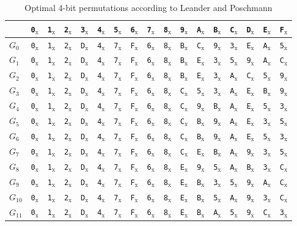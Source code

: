 \documentclass[runningheads,a4paper,english]{llncs}
\newcommand{\hex}[1]{\texttt{#1}$_\text{x}$}
\begin{document}
\begin{table}[]
    \label{tab:rep}
        \caption{Optimal 4-bit permutations according to Leander and Poschmann}
    \centering
     \begin{tabular}{l||cccccccccccccccc|}
	&{\hex{0}} &{\hex{1}} &{\hex{2}}& \hex{3}& \hex{4}& \hex{5}& \hex{6}& \hex{7}& \hex{8}& \hex{9}& \hex{A}& \hex{B}& \hex{C}& \hex{D}& \hex{E}& \hex{F}\\
	\hline\hline
 $G_0$ &\hex{0}&\hex{1}&\hex{2}&\hex{D}&\hex{4}&\hex{7}&\hex{F}&\hex{6}&\hex{8}&\hex{B}&\hex{C}&\hex{9}&\hex{3}&\hex{E}&\hex{A}&\hex{5}\\
 \hline
$G_1$ &\hex{0}&\hex{1}&\hex{2}&\hex{D}&\hex{4}&\hex{7}&\hex{F}&\hex{6}&\hex{8}&\hex{B}&\hex{E}&\hex{3}&\hex{5}&\hex{9}&\hex{A}&\hex{C}\\
\hline
$G_2$ &\hex{0}&\hex{1}&\hex{2}&\hex{D}&\hex{4}&\hex{7}&\hex{F}&\hex{6}&\hex{8}&\hex{B}&\hex{E}&\hex{3}&\hex{A}&\hex{C}&\hex{5}&\hex{9}\\\hline
$G_3 $&\hex{0}&\hex{1}&\hex{2}&\hex{D}&\hex{4}&\hex{7}&\hex{F}&\hex{6}&\hex{8}&\hex{C}&\hex{5}&\hex{3}&\hex{A}&\hex{E}&\hex{B}&\hex{9}\\\hline
$G_4$ &\hex{0}&\hex{1}&\hex{2}&\hex{D}&\hex{4}&\hex{7}&\hex{F}&\hex{6}&\hex{8}&\hex{C}&\hex{9}&\hex{B}&\hex{A}&\hex{E}&\hex{5}&\hex{3}\\\hline
$G_5$ &\hex{0}&\hex{1}&\hex{2}&\hex{D}&\hex{4}&\hex{7}&\hex{F}&\hex{6}&\hex{8}&\hex{C}&\hex{B}&\hex{9}&\hex{A}&\hex{E}&\hex{3}&\hex{5}\\\hline
$G_6$ &\hex{0}&\hex{1}&\hex{2}&\hex{D}&\hex{4}&\hex{7}&\hex{F}&\hex{6}&\hex{8}&\hex{C}&\hex{B}&\hex{9}&\hex{A}&\hex{E}&\hex{5}&\hex{3}\\\hline
$G_7 $&\hex{0}&\hex{1}&\hex{2}&\hex{D}&\hex{4}&\hex{7}&\hex{F}&\hex{6}&\hex{8}&\hex{C}&\hex{E}&\hex{B}&\hex{A}&\hex{9}&\hex{3}&\hex{5}\\\hline
$G_8$ &\hex{0}&\hex{1}&\hex{2}&\hex{D}&\hex{4}&\hex{7}&\hex{F}&\hex{6}&\hex{8}&\hex{E}&\hex{9}&\hex{5}&\hex{A}&\hex{B}&\hex{3}&\hex{C}\\\hline
$G_9$ &\hex{0}&\hex{1}&\hex{2}&\hex{D}&\hex{4}&\hex{7}&\hex{F}&\hex{6}&\hex{8}&\hex{E}&\hex{B}&\hex{3}&\hex{5}&\hex{9}&\hex{A}&\hex{C}\\\hline
$G_{10}$&\hex{0}&\hex{1}&\hex{2}&\hex{D}&\hex{4}&\hex{7}&\hex{F}&\hex{6}&\hex{8}&\hex{E}&\hex{B}&\hex{5}&\hex{A}&\hex{9}&\hex{3}&\hex{C}\\\hline
$G_{11}$&\hex{0}&\hex{1}&\hex{2}&\hex{D}&\hex{4}&\hex{7}&\hex{F}&\hex{6}&\hex{8}&\hex{E}&\hex{B}&\hex{A}&\hex{5}&\hex{9}&\hex{C}&\hex{3}\\\hline

\end{tabular}
\end{table}
\end{document}
